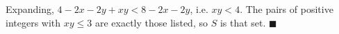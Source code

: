 Expanding, $4-2x-2y+xy<8-2x-2y$, i.e. $xy<4$. The pairs of positive integers with $xy\le3$ are exactly those listed, so $S$ is that set. $\blacksquare$
